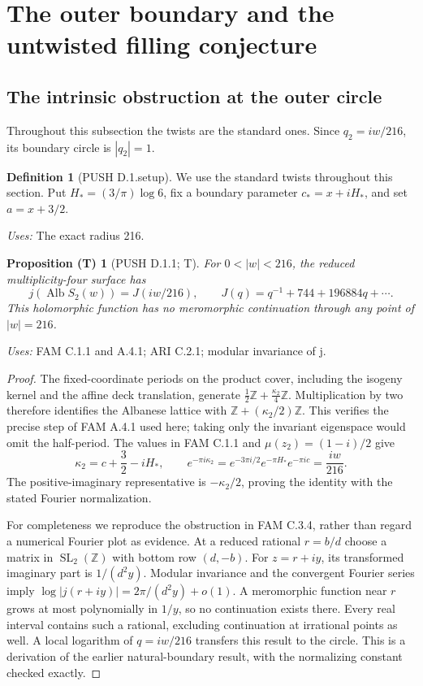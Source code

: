 \documentclass[11pt,a4paper]{article}
\theoremstyle{plain}
\newtheorem{proposition}[theorem]{Proposition (T)}
\theoremstyle{definition}
\newtheorem{definition}[theorem]{Definition}
\begin{document}
\section{The outer boundary and the untwisted filling conjecture}
\label{sec:ends}
\subsection{The intrinsic obstruction at the outer circle}
Throughout this subsection the twists are the standard ones.
Since $q_2=iw/216$, its boundary circle is $|q_2|=1$.
\begin{definition}[PUSH D.1.setup]\label{push:D.1.setup}
We use the standard twists throughout this section. Put
\(H_*=(3/\pi)\log6\), fix a boundary parameter
\(c_*=x+iH_*\), and set \(a=x+3/2\).
\end{definition}
\noindent\emph{Uses:} The exact radius 216.\par

\begin{proposition}[PUSH D.1.1; T]\label{push:D.1.1}
For \(0<|w|<216\), the reduced multiplicity-four surface has
\[
 j(\operatorname{Alb}S_2(w))=J(iw/216),\qquad
 J(q)=q^{-1}+744+196884q+\cdots.
\]
This holomorphic function has no meromorphic continuation through any
point of \(|w|=216\).
\end{proposition}
\noindent\emph{Uses:} FAM C.1.1 and A.4.1; ARI C.2.1; modular invariance of j.\par

\begin{proof}
The fixed-coordinate periods on the product cover, including the
isogeny kernel and the affine deck translation, generate
\(\frac12\mathbb Z+\frac{\kappa_2}{4}\mathbb Z\).
Multiplication by two therefore identifies the Albanese lattice with
\(\mathbb Z+(\kappa_2/2)\mathbb Z\). This verifies the precise step of
FAM A.4.1 used here; taking only the invariant eigenspace would omit the
half-period. The values in FAM C.1.1 and \(\mu(z_2)=(1-i)/2\) give
\[
 \kappa_2=c+\frac32-iH_*,\qquad
 e^{-\pi i\kappa_2}=e^{-3\pi i/2}e^{-\pi H_*}e^{-\pi ic}
 =\frac{iw}{216}.
\]
The positive-imaginary representative is \(-\kappa_2/2\), proving the
identity with the stated Fourier normalization.

For completeness we reproduce the obstruction in FAM C.3.4, rather than regard a numerical Fourier plot as evidence. At a
reduced rational \(r=b/d\) choose a matrix in
\(\operatorname{SL}_2(\mathbb Z)\) with bottom row \((d,-b)\).
For \(z=r+iy\), its transformed imaginary part is \(1/(d^2y)\).
Modular invariance and the convergent Fourier series imply
\(\log|j(r+iy)|=2\pi/(d^2y)+o(1)\).
A meromorphic function near \(r\) grows at most polynomially in
\(1/y\), so no continuation exists there. Every real interval contains
such a rational, excluding continuation at irrational points as well.
A local logarithm of \(q=iw/216\) transfers this result to the circle.
This is a derivation of the earlier natural-boundary result, with the
normalizing constant checked exactly.
\end{proof}
\end{document}
